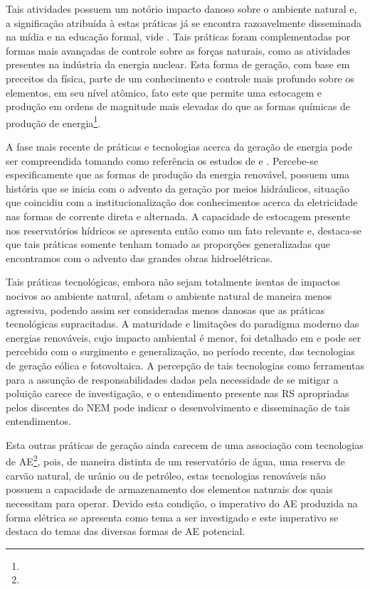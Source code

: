 \documentclass[
  12pt,       %
  openright,      %
  twoside,      %
  a4paper,      %
  english,      %
  french,       %
  spanish,      %
  brazil        %
  ]{abntex2}
\begin{document}
Tais atividades possuem um notório impacto danoso sobre o ambiente natural e, a significação atribuída à estas práticas já se encontra razoavelmente disseminada na mídia e na educação formal, vide . Tais práticas foram complementadas por formas mais avançadas de controle sobre as forças naturais, como as atividades presentes na indústria da energia nuclear. Esta forma de geração, com base em preceitos da física, parte de um conhecimento e controle mais profundo sobre os elementos, em seu nível atômico, fato este que permite uma estocagem e produção em ordens de magnitude mais elevadas do que as formas químicas de produção de energia\footnote{}.

A fase mais recente de práticas e tecnologias acerca da geração de energia pode ser compreendida tomando como referência os estudos de  e . Percebe-se especificamente que as formas de produção da energia renovável, possuem uma história que se inicia com o advento da geração por meios hidráulicos, situação que coincidiu com a institucionalização dos conhecimentos acerca da eletricidade nas formas de corrente direta e alternada. A capacidade de estocagem presente nos reservatórios hídricos se apresenta então como um fato relevante e, destaca-se que tais práticas somente tenham tomado as proporções generalizadas que encontramos com o advento das grandes obras hidroelétricas. 

Tais práticas tecnológicas, embora não sejam totalmente isentas de impactos nocivos ao ambiente natural, afetam o ambiente natural de maneira menos agressiva, podendo assim ser consideradas menos danosas que as práticas tecnológicas supracitadas. A maturidade e limitações do paradigma moderno das energias renováveis, cujo impacto ambiental é menor, foi detalhado em  e pode ser percebido com o surgimento e generalização, no período recente, das tecnologias de geração eólica e fotovoltaica. A percepção de tais tecnologias como ferramentas para a assunção de responsabilidades dadas pela necessidade de se mitigar a poluição carece de investigação, e o entendimento presente nas RS apropriadas pelos discentes do NEM pode indicar o desenvolvimento e disseminação de tais entendimentos.

Esta outras práticas de geração ainda carecem de uma associação com tecnologias de AE\footnote{}, pois, de maneira distinta de um reservatório de água, uma reserva de carvão natural, de urânio ou de petróleo, estas tecnologias renováveis não possuem a capacidade de armazenamento dos elementos naturais dos quais necessitam para operar. Devido esta condição, o imperativo do AE produzida na forma elétrica se apresenta como tema a ser investigado e este imperativo se destaca do temas das diversas formas de AE potencial. 
\end{document}
